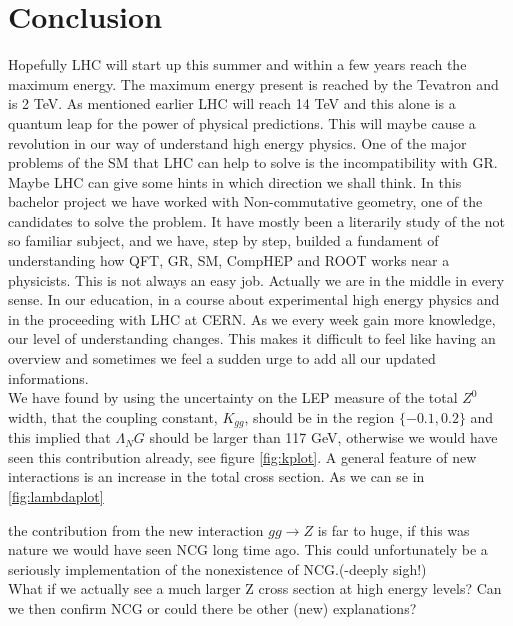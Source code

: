 \section{Conclusion}
Hopefully LHC will start up this summer and within a few years reach the maximum energy. The maximum energy present is reached by the Tevatron and is 2 TeV. As mentioned earlier LHC will reach 14 TeV and this alone is a quantum leap for the power of physical predictions. This will maybe cause a revolution in our way of understand high energy physics. One of the major problems of the SM that LHC can help to solve is the incompatibility with GR. Maybe LHC can give some hints in which direction we shall think. In this bachelor project we have worked with Non-commutative geometry, one of the candidates to solve the problem. It have mostly been a literarily study of the not so familiar subject, and we have, step by step, builded a fundament of understanding how QFT, GR, SM, CompHEP and ROOT works near a physicists. This is not always an easy job. Actually we are in the middle in every sense. In our education, in a course about experimental high energy physics and in the proceeding with LHC at CERN. As we every week gain more knowledge, our level of understanding changes. This makes it difficult to feel like having an overview and sometimes we feel a sudden urge to add all our updated informations.\\


We have found by using the uncertainty on the LEP measure of the total $Z^0$ width, that the coupling constant, $K_{gg}$, should be in the region $\{-0.1,0.2\}$ and this implied that $\Lambda_NG$ should be larger than 117 GeV, otherwise we would have seen this contribution already, see figure \ref{fig:kplot}. A general feature of new interactions is an increase in the total cross section. As we can se in \ref{fig:lambdaplot}


the contribution from the new interaction $gg \rightarrow Z$ is far to huge, if this was nature we would have seen NCG long time ago. This could unfortunately be a seriously implementation of the nonexistence of NCG.(-deeply sigh!)\\

What if we actually see a much larger Z cross section at high energy levels? Can we then confirm NCG or could there be other (new) explanations?
